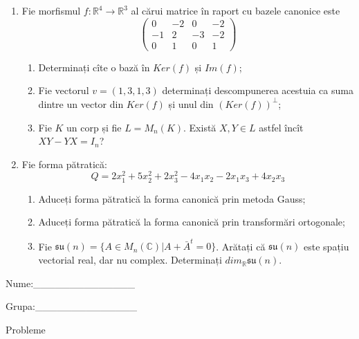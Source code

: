\documentclass{article}
\begin{document}
\begin{enumerate}
 \item Fie morfismul $f:\mathbb{R}^4 \to \mathbb{R}^3$ al cărui matrice în raport cu bazele canonice este
$$\begin{pmatrix}
0&-2&0&-2\\
-1&2&-3&-2\\
0&1&0&1
\end{pmatrix}$$

\begin{enumerate}
\item Determinați cîte o bază în $Ker(f)$ și $Im(f)$;
\item Fie vectorul $v=(1,3,1,3)$ determinați descompunerea acestuia ca suma dintre un vector din $Ker(f)$ și unul din $(Ker(f))^\perp$;
\item Fie $K$ un corp și fie $L=M_n(K)$. Există $X,Y \in L$ astfel încît $XY-YX=I_n$?  
\end{enumerate}
\item Fie forma pătratică:
$$Q= 2x_1^2+5x_2^2+2x_3^2-4x_1x_2-2x_1x_3+4x_2x_3$$

\begin{enumerate}
\item Aduceți forma pătratică la forma canonică prin metoda Gauss;
\item Aduceți forma pătratică la forma canonică prin transformări ortogonale;
\item Fie $\mathfrak{su}(n)=\{ A \in M_n(\mathbb{C}) | A+\bar{A}^t=0\}$. Arătați că $\mathfrak{su}(n)$ este spațiu vectorial real, dar nu complex.
Determinați $dim_{\mathbb{R}}\mathfrak{su}(n)$.
\end{enumerate}
\end{enumerate}
\newpage
\begin{flushright}
Nume:\_\_\_\_\_\_\_\_\_\_\_\_\_\_
 
 
Grupa:\_\_\_\_\_\_\_\_\_\_\_\_\_\_
\end{flushright}
\begin{center}
\vspace{2cm}
{\Large Probleme}
\vspace{2cm}
\end{center}
\end{document}
